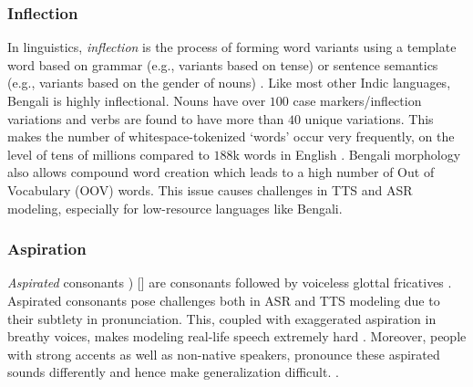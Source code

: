 \subsubsection{Inflection}

In linguistics, \textit{inflection} is the process of forming word variants using a template word based on grammar (e.g., variants based on tense) or sentence semantics (e.g., variants based on the gender of nouns) \cite{owens1998}.
Like most other Indic languages, Bengali is highly inflectional. Nouns have over $100$ case markers/inflection variations and verbs are found to have more than $40$ unique variations. This makes the number of whitespace-tokenized `words' occur very frequently, on the level of tens of millions compared to $188$k words in English \cite{stevenson2010oxford}. Bengali morphology also allows compound word creation which leads to a high number of Out of Vocabulary (OOV) words. This issue causes challenges in TTS and ASR modeling, especially for low-resource languages \cite{murthy2018effect} like Bengali.



\subsubsection{Aspiration}
\textit{Aspirated} consonants \emph{{}}) [\emph{}]
are consonants followed by voiceless glottal fricatives \cite{vaux1998laryngeal}. Aspirated consonants pose challenges both in ASR and TTS modeling due to their subtlety in pronunciation. This, coupled with exaggerated aspiration in breathy voices, makes modeling real-life speech extremely hard \cite{berezina2010autoregressive}. Moreover, people with strong accents as well as non-native speakers, pronounce these aspirated sounds differently and hence make generalization difficult. \cite{li2016improving}. 

